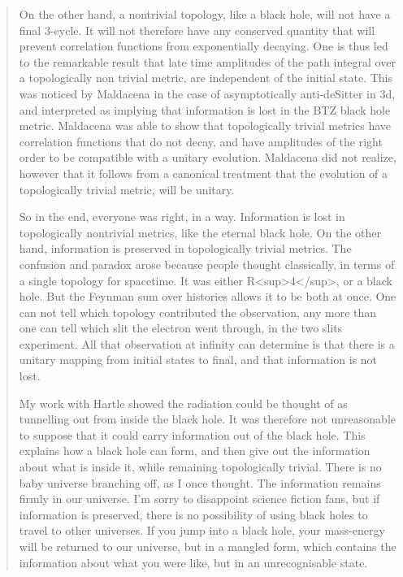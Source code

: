 \begin{quote}
     On the other hand, a nontrivial topology, like a black hole, will 
     not have a final 3-cycle.  It will not therefore have any conserved
     quantity that will prevent correlation functions from exponentially
     decaying.  One is thus led to the remarkable result that late time
     amplitudes of the path integral over a topologically non trivial
     metric, are independent of the initial state. This was noticed by
     Maldacena in the case of asymptotically anti-deSitter in 3d, and
     interpreted as implying that information is lost in the BTZ black hole
     metric.  Maldacena was able to show that topologically trivial metrics
     have correlation functions that do not decay, and have amplitudes of
     the right order to be compatible with a unitary evolution.  Maldacena
     did not realize, however that it follows from a canonical treatment
     that the evolution of a topologically trivial metric, will be unitary.

     So in the end, everyone was right, in a way.  Information is lost 
     in topologically nontrivial metrics, like the eternal black hole. 
     On the other hand, information is preserved in topologically trivial
     metrics. The confusion and paradox arose because people thought
     classically, in terms of a single topology for spacetime.  It was
     either R<sup>4</sup>, 
or a black hole.  But the Feynman sum over histories allows
     it to be both at once.  One can not tell which topology contributed the
     observation, any more than one can tell which slit the electron went
     through, in the two slits experiment.  All that observation at infinity
     can determine is that there is a unitary mapping from initial states
     to final, and that information is not lost.

     My work with Hartle showed the radiation could be thought of as
     tunnelling out from inside the black hole.  It was therefore not
     unreasonable to suppose that it could carry information out of the
     black hole.  This explains how a black hole can form, and then give
     out the information about what is inside it, while remaining
     topologically trivial.  There is no baby universe branching off, as 
     I once thought.  The information remains firmly in our universe. 
     I'm sorry to disappoint science fiction fans, but if information is
     preserved, there is no possibility of using black holes to travel to
     other universes. If you jump into a black hole, your mass-energy will
     be returned to our universe, but in a mangled form, which contains the
     information about what you were like, but in an unrecognisable state.


\end{quote}
